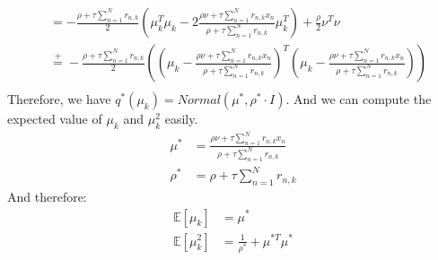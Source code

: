 \documentclass{article}
\begin{document}
\begin{equation}
\begin{split}
                    & = -\frac{\rho + \tau \sum_{n=1}^{N}r_{n,k}}{2}\left(\mu_k^T \mu_k - 2 \frac{\rho \nu + \tau \sum_{n=1}^{N}r_{n,k}x_n}{\rho + \tau \sum_{n=1}^{N}r_{n,k}}\mu_k^T\right) + \frac{\rho}{2}\nu^T\nu                                                                                          \\
                    & \overset{+}{=} -\frac{\rho + \tau \sum_{n=1}^{N}r_{n,k}}{2}\left(\left(\mu_k - \frac{\rho \nu + \tau \sum_{n=1}^{N}r_{n,k}x_n}{\rho + \tau \sum_{n=1}^{N}r_{n,k}}\right)^T\left(\mu_k - \frac{\rho \nu + \tau \sum_{n=1}^{N}r_{n,k}x_n}{\rho + \tau \sum_{n=1}^{N}r_{n,k}}\right)\right) \\
  \end{split}
\end{equation}
Therefore, we have $q^*(\mu_k) = Normal\left(\mu^*, \rho^* \cdot I\right)$. And we can compute the expected value of $\mu_k$ and $\mu_k^2$ easily.
\begin{equation}
  \begin{split}
    \mu^*  & = \frac{\rho \nu + \tau \sum_{n=1}^{N}r_{n,k}x_n}{\rho + \tau \sum_{n=1}^{N}r_{n,k}} \\
    \rho^* & = \rho + \tau \sum_{n=1}^{N}r_{n,k}
  \end{split}
\end{equation}
And therefore:
\begin{equation}
  \begin{split}
    \mathbb{E}[\mu_k]   & = \mu^*                            \\
    \mathbb{E}[\mu_k^2] & = \frac{1}{\rho^*} + \mu^{*T}\mu^*
  \end{split}
\end{equation}
\end{document}
